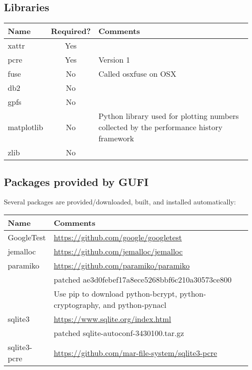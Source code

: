 \subsection{Libraries}
\begin{tabularx}{\textwidth}{| l | c | X |}
  \hline
  Name & Required? & Comments \\
  \hline
  xattr & Yes & \\
  \hline
  pcre & Yes & Version 1 \\
  \hline
  fuse & No & Called osxfuse on OSX \\
  \hline
  db2 & No & \\
  \hline
  gpfs & No & \\
  \hline
  matplotlib & No & Python library used for plotting numbers collected
  by the performance history framework \\
  \hline
  zlib & No & \\
  \hline
\end{tabularx}

\subsection{Packages provided by GUFI}
Several packages are provided/downloaded, built, and installed
automatically:
\begin{tabularx}{\textwidth}{| l | X |}
  \hline
  Name & Comments \\
  \hline
  GoogleTest & \url{https://github.com/google/googletest} \\
  \hline
  jemalloc & \url{https://github.com/jemalloc/jemalloc} \\
  \hline
  paramiko & \url{https://github.com/paramiko/paramiko} \\
  & patched ae3d0febef17a8ece5268bbf6c210a30573ce800 \\
  & Use pip to download python-bcrypt, python-cryptography, and
  python-pynacl \\
  \hline
  sqlite3 & \url{https://www.sqlite.org/index.html} \\
  & patched sqlite-autoconf-3430100.tar.gz \\
  \hline
  sqlite3-pcre & \url{https://github.com/mar-file-system/sqlite3-pcre}
  \\
  \hline
\end{tabularx}
